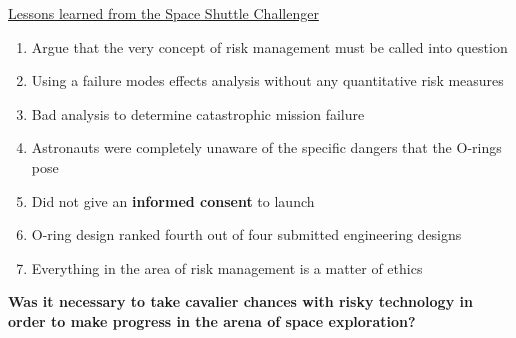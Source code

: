 \documentclass[aspectratio=1610,pdftex,dvipsnames,compress,xcolor={dvipsnames}]{beamer}
\begin{document}
\begin{frame}{\href{https://uidaho.pressbooks.pub/riskassessment/chapter/contemporary-cases-in-risk-assessment-2/}{Lessons learned from the Space Shuttle Challenger}}
    \begin{enumerate}[series=outerlist,topsep=0pt,itemsep=15pt,leftmargin=*,label=(\arabic*)]
        \item[]Argue that the very concept of risk management must be called into question  
        \item[]Using a failure modes effects analysis without any quantitative risk measures
        \item[]Bad analysis to determine catastrophic mission failure
        \item[]Astronauts were completely unaware of the specific dangers that the O-rings pose  
        \item[]Did not give an \textbf{informed consent} to launch
        \item[]O-ring design ranked fourth out of four submitted engineering designs
        \item[]Everything in the area of risk management is a matter of ethics
    \end{enumerate}
\end{frame}


\begin{frame}[plain]{}
    \centering\textbf{Was it necessary to take cavalier chances with risky technology in order to make progress in the arena of space exploration?}
\end{frame}
\end{document}

